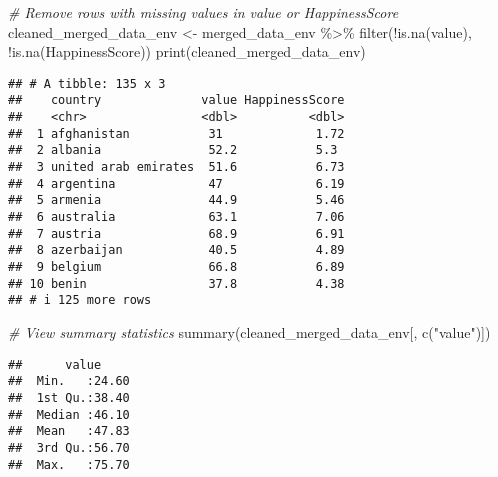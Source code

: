 \documentclass[
]{article}
\newenvironment{Shaded}{\begin{snugshade}}{\end{snugshade}}
\newcommand{\CommentTok}[1]{\textcolor[rgb]{0.56,0.35,0.01}{\textit{#1}}}
\newcommand{\FunctionTok}[1]{\textcolor[rgb]{0.00,0.00,0.00}{#1}}
\newcommand{\NormalTok}[1]{#1}
\newcommand{\OtherTok}[1]{\textcolor[rgb]{0.56,0.35,0.01}{#1}}
\newcommand{\SpecialCharTok}[1]{\textcolor[rgb]{0.00,0.00,0.00}{#1}}
\newcommand{\StringTok}[1]{\textcolor[rgb]{0.31,0.60,0.02}{#1}}
\begin{document}
\begin{Shaded}
\begin{Highlighting}[]
\CommentTok{\# Remove rows with missing values in value or HappinessScore}
\NormalTok{cleaned\_merged\_data\_env }\OtherTok{\textless{}{-}}\NormalTok{ merged\_data\_env }\SpecialCharTok{\%\textgreater{}\%}
  \FunctionTok{filter}\NormalTok{(}\SpecialCharTok{!}\FunctionTok{is.na}\NormalTok{(value), }\SpecialCharTok{!}\FunctionTok{is.na}\NormalTok{(HappinessScore))}
\FunctionTok{print}\NormalTok{(cleaned\_merged\_data\_env)}
\end{Highlighting}
\end{Shaded}

\begin{verbatim}
## # A tibble: 135 x 3
##    country              value HappinessScore
##    <chr>                <dbl>          <dbl>
##  1 afghanistan           31             1.72
##  2 albania               52.2           5.3 
##  3 united arab emirates  51.6           6.73
##  4 argentina             47             6.19
##  5 armenia               44.9           5.46
##  6 australia             63.1           7.06
##  7 austria               68.9           6.91
##  8 azerbaijan            40.5           4.89
##  9 belgium               66.8           6.89
## 10 benin                 37.8           4.38
## # i 125 more rows
\end{verbatim}

\begin{Shaded}
\begin{Highlighting}[]
\CommentTok{\# View summary statistics }
\FunctionTok{summary}\NormalTok{(cleaned\_merged\_data\_env[, }\FunctionTok{c}\NormalTok{(}\StringTok{"value"}\NormalTok{)])}
\end{Highlighting}
\end{Shaded}

\begin{verbatim}
##      value      
##  Min.   :24.60  
##  1st Qu.:38.40  
##  Median :46.10  
##  Mean   :47.83  
##  3rd Qu.:56.70  
##  Max.   :75.70
\end{verbatim}
\end{document}
